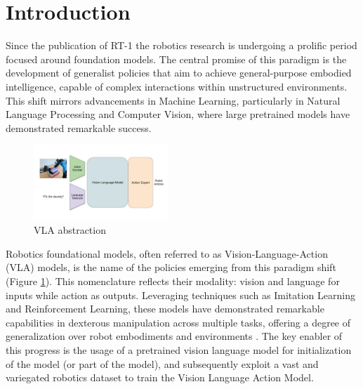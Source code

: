 \section{Introduction}


Since the publication of RT-1 \cite{RT-1} the robotics research is undergoing a prolific period focused around foundation models. The central promise of this paradigm is the development of generalist policies that aim to achieve general-purpose embodied intelligence, capable of complex interactions within unstructured environments. This shift mirrors advancements in Machine Learning, particularly in Natural Language Processing and Computer Vision, where large pretrained models have demonstrated remarkable success.

\begin{figure}
    \centering
    \includegraphics[width=0.45\textwidth]{images/vla.jpg}
    \caption{VLA abstraction}
    \label{fig:vla_abstraction}
\end{figure}

Robotics foundational models, often referred to as Vision-Language-Action (VLA) models, is the name of the policies emerging from this paradigm shift (Figure \ref{fig:vla_abstraction}). This nomenclature reflects their modality: vision and language for inputs while action as outputs. Leveraging techniques such as Imitation Learning and Reinforcement Learning, these models have demonstrated remarkable capabilities in dexterous manipulation across multiple tasks, offering a degree of generalization over robot embodiments and environments \cite{TransferWelle}. The key enabler of this progress is the usage of a pretrained vision language model for initialization of the model (or part of the model), and subsequently exploit a vast and variegated robotics dataset to train the Vision Language Action Model.



